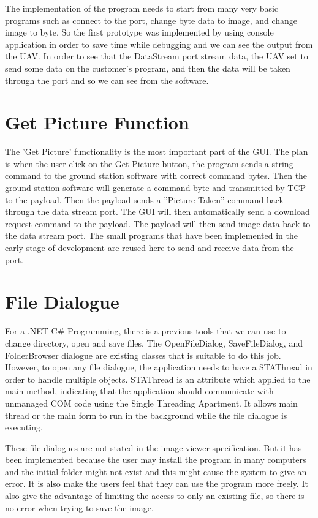The implementation of the program needs to start from many very basic programs such as connect to the port, change byte data to image, and change image to byte. 
So the first prototype was implemented by using console application in order to save time while debugging and we can see the output from the UAV. In order to see that the DataStream port stream data, the UAV set to send some data on the customer’s program, and then the data will be taken through the port and so we can see from the software.  

\section{Get Picture Function}
The 'Get Picture' functionality is the most important part of the GUI. The plan is when the user click on the Get Picture button, the program sends a string command to the ground station software with correct command bytes. Then the ground station software will generate a command byte and transmitted by TCP to the payload. Then the payload sends a ''Picture Taken'' command back through the data stream port. The GUI will then automatically send a download request command to the payload. The payload will then send image data back to the data stream port. The small programs that have been implemented in the early stage of development are reused here to send and receive data from the port. 

\section{File Dialogue}
For a .NET C\# Programming, there is a previous tools that we can use to change directory, open and save files. The OpenFileDialog,  SaveFileDialog, and FolderBrowser dialogue are existing classes that is suitable to do this job. However, to open any file dialogue, the application needs to have a STAThread in order to handle multiple objects. STAThread is an attribute which applied to the main method, indicating that the application should communicate with unmanaged COM code using the Single Threading Apartment. It allows main thread or the main form to run in the background while the file dialogue is executing. 

These file dialogues are not stated in the image viewer specification. But it has been implemented because the user may install the program in many computers and the initial folder might not exist and this might cause the system to give an error. It is also make the users feel that they can use the program more freely.  It also give the advantage of limiting the access to only an existing file, so there is no error when trying to save the image.

